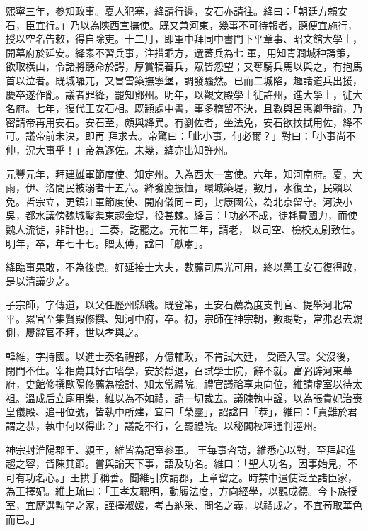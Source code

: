 \begin{pinyinscope}
 熙寧三年，參知政事。夏人犯塞，絳請行邊，安石亦請往。絳曰：「朝廷方賴安石，臣宜行。」乃以為陝西宣撫使。既又兼河東，幾事不可待報者，聽便宜施行，授以空名告敕，得自除吏。十二月，即軍中拜同中書門下平章事、昭文館大學士，開幕府於延安。絳素不習兵事，注措乖方，選蕃兵為七
 軍，用知青澗城种諤策，欲取橫山，令諸將聽命於諤，厚賞犒蕃兵，眾皆怨望；又奪騎兵馬以與之，有抱馬首以泣者。既城囉兀，又冒雪築撫寧堡，調發騷然。已而二城陷，趣諸道兵出援，慶卒遂作亂。議者罪絳，罷知鄧州。明年，以觀文殿學士徙許州，進大學士，徙大名府。七年，復代王安石相。既顓處中書，事多稽留不決，且數與呂惠卿爭論，乃密請帝再用安石。安石至，頗與絳異。有劉佐者，坐法免，安石欲抆拭用佐，絳不可。議帝前未決，即再
 拜求去。帝驚曰：「此小事，何必爾？」對曰：「小事尚不伸，況大事乎！」帝為逐佐。未幾，絳亦出知許州。



 元豐元年，拜建雄軍節度使、知定州。入為西太一宮使。六年，知河南府。夏，大雨，伊、洛間民被溺者十五六。絳發廩振恤，環城築堤，數月，水復至，民賴以免。哲宗立，更鎮江軍節度使、開府儀同三司，封康國公，為北京留守。河決小吳，都水議傍魏城鑿渠東趨金堤，役甚棘。絳言：「功必不成，徒耗費國力，而使魏人流徙，非計也。」三奏，訖罷之。元祐二年，請老，
 以司空、檢校太尉致仕。明年，卒，年七十七。贈太傅，諡曰「獻肅」。



 絳臨事果敢，不為後慮。好延接士大夫，數薦司馬光可用，終以黨王安石復得政，是以清議少之。



 子宗師，字傳道，以父任歷州縣職。既登第，王安石薦為度支判官、提舉河北常平。累官至集賢殿修撰、知河中府，卒。初，宗師在神宗朝，數賜對，常弗忍去親側，屢辭官不拜，世以孝與之。



 韓維，字持國。以進士奏名禮部，方億輔政，不肯試大廷，
 受蔭入官。父沒後，閉門不仕。宰相薦其好古嗜學，安於靜退，召試學士院，辭不就。富弼辟河東幕府，史館修撰歐陽修薦為檢討、知太常禮院。禮官議祫享東向位，維請虛室以待太祖。溫成后立廟用樂，維以為不如禮，請一切裁去。議陳執中諡，以為張貴妃治喪皇儀殿、追冊位號，皆執中所建，宜曰「榮靈」，詔諡曰「恭」，維曰：「責難於君謂之恭，執中何以得此？」議訖不行，乞罷禮院。以秘閣校理通判涇州。



 神宗封淮陽郡王、潁王，維皆為記室參軍。
 王每事咨訪，維悉心以對，至拜起進趨之容，皆陳其節。嘗與論天下事，語及功名。維曰：「聖人功名，因事始見，不可有功名心。」王拱手稱善。聞維引疾請郡，上章留之。時禁中遣使泛至諸臣家，為王擇妃。維上疏曰：「王孝友聰明，動履法度，方向經學，以觀成德。今卜族授室，宜歷選勲望之家，謹擇淑媛，考古納采、問名之義，以禮成之，不宜苟取華色而已。」




\end{pinyinscope}
